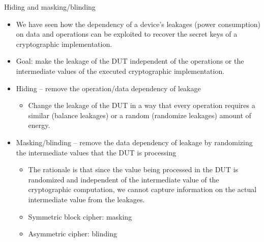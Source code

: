 \begin{frame}{Hiding and masking/blinding}
\begin{itemize}
    \item We have seen how the dependency of a device's leakages (power consumption) on data and operations can be exploited to recover the secret keys of a cryptographic implementation.
   \item Goal: make the leakage of the DUT independent of the operations or the intermediate values of the executed cryptographic implementation.
    \item Hiding -- remove the operation/data dependency of leakage
    \begin{itemize}
        \item Change the leakage of the DUT in a way that every operation requires a similar (balance leakages) or a random (randomize leakages) amount of energy.
    \end{itemize}
    \item Masking/blinding -- remove the data dependency of leakage by randomizing the intermediate values that the DUT is processing
    \begin{itemize}
        \item The rationale is that since the value being processed in the DUT is randomized and independent of the intermediate value of the cryptographic computation, we cannot capture information on the actual intermediate value from the leakages.
        \item Symmetric block cipher: masking
        \item Asymmetric cipher: blinding
    \end{itemize}
\end{itemize}    
\end{frame}


